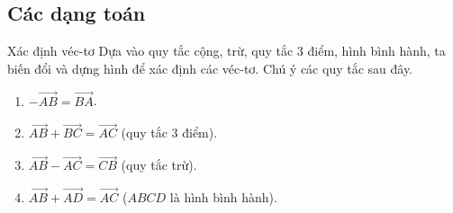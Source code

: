 \subsection{Các dạng toán}
\begin{dang}{Xác định véc-tơ}
Dựa vào quy tắc cộng, trừ, quy tắc 3 điểm, hình bình hành, ta biến đổi và dựng hình để xác định các véc-tơ. Chú ý các quy tắc sau đây.
\begin{multicols}{2}
\begin{enumerate}
	\item $-\vec{AB}=\vec{BA}$.
	\item $\vec{AB}+\vec{BC}=\vec{AC}$ (quy tắc 3 điểm). 
	\item $\vec{AB}-\vec{AC}=\vec{CB}$ (quy tắc trừ).
	\item $\vec{AB}+\vec{AD}=\vec{AC}$ ($ABCD$ là hình bình hành).
\end{enumerate}
\end{multicols}
	
\end{dang}

